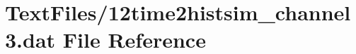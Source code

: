 \hypertarget{12time2histsim__channel3_8dat}{}\section{Text\+Files/12time2histsim\+\_\+channel3.dat File Reference}
\label{12time2histsim__channel3_8dat}
